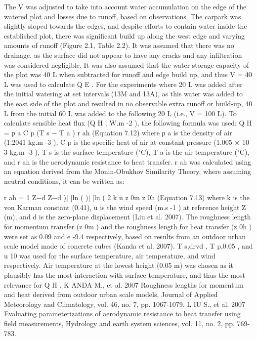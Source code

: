 \documentclass[final,3p,times,authoryear]{elsarticle}
\begin{document}
{The V was adjusted to take into account water accumulation on the edge of the watered
plot and losses due to runoff, based on observations. The carpark was slightly sloped
towards the edges, and despite efforts to contain water inside the established plot, there
was significant build up along the west edge and varying amounts of runoff (Figure 2.1,
Table 2.2). It was assumed that there was no drainage, as the surface did not appear to
have any cracks and any infiltration was considered negligible. It was also assumed that
the water storage capacity of the plot was 40 L when subtracted for runoff and edge
build up, and thus V = 40 L was used to calculate Q E . For the experiments where 20 L
was added after the initial watering at set intervals (13M and 13A), as this water was
added to the east side of the plot and resulted in no observable extra runoff or build-up,
40 L from the initial 60 L was added to the following 20 L (i.e., V = 100 L).
To calculate sensible heat flux (Q H , W.m -2 ), the following formula was used:
Q H = ρ a C p
(T s − T a )
r ah
(Equation 7.12)
where ρ a is the density of air (1.2041 kg.m -3 ), C p is the specific heat of air at constant
pressure (1.005 × 10 3 kg.m -3 ), T s is the surface temperature ($^{\circ}$C), T a is the air
temperature ($^{\circ}$C), and r ah is the aerodynamic resistance to heat transfer. r ah was
calculated using an equation derived from the Monin-Obukhov Similarity Theory,
where assuming neutral conditions, it can be written as:

r ah =
1
Z−d
Z−d
)] [ln (
)]
[ln (
2
k u
z 0m
z 0h
(Equation 7.13)
where k is the von Karman constant (0.41), u is the wind speed (m.s -1 ) at reference
height Z (m), and d is the zero-plane displacement (Liu et al. 2007).
The roughness length for momentum transfer (z 0m ) and the roughness length for heat
transfer (z 0h ) were set as 0.09 and e -9.4 respectively, based on results from an outdoor
urban scale model made of concrete cubes (Kanda et al. 2007). T s,drvd , T p,0.05 , and u 10
was used for the surface temperature, air temperature, and wind respectively. Air
temperature at the lowest height (0.05 m) was chosen as it plausibly has the most
interaction with surface temperature, and thus the most relevance for Q H .
K ANDA M., et al. 2007 Roughness lengths for momentum and heat derived from outdoor urban
scale models, Journal of Applied Meteorology and Climatology, vol. 46, no. 7, pp.
1067-1079.
L IU S., et al. 2007 Evaluating parameterizations of aerodynamic resistance to heat transfer using
field measurements, Hydrology and earth system sciences, vol. 11, no. 2, pp. 769-783.

}
\end{document}
